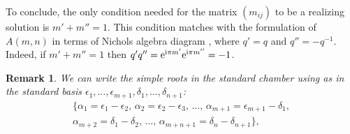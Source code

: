 \documentclass[pdftex]{sigma}%
\numberwithin{equation}{section}
\newtheorem{oss}[teo]{Remark} }
\begin{document}
To conclude, the only condition needed for the matrix $(m_{ij})$ to be a realizing solution is $m' + m'' = 1$. This condition matches with the formulation of $A(m,n)$ in terms of Nichols algebra diagram \cite[Table~C, row 2]{Heck06}, where $q'=q$ and $q''= -q^{-1}$. Indeed, if $m' + m'' = 1$ then $q'q''={\rm e}^{{\rm i}\pi m'}{\rm e}^{{\rm i}\pi m''} =-1$.
\begin{oss} We can write the simple roots in the standard chamber using as in \cite{Kac77} the standard basis $\epsilon_1, \dots, \epsilon_{m+1}, \delta_1, \dots, \delta_{n+1}$:
\begin{gather*}
 \{ \alpha_1 = \epsilon_1-\epsilon_2, \,\alpha_2= \epsilon_2-\epsilon_3, \,\dots,\,  \alpha_{m+1}= \epsilon_{m+1}-\delta_1, \\
 \alpha_{m+2}=\delta_1-\delta_2, \,\dots,\,\alpha_{m+n+1}=\delta_n-\delta_{n+1} \},
\end{gather*}
\end{oss}
\end{document}
